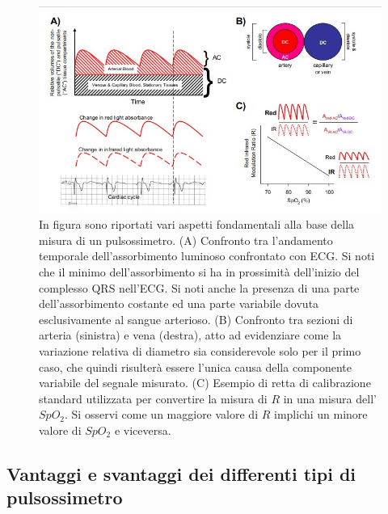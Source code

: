 \documentclass[a4paper, 12pt]{book}
\begin{document}
\begin{figure}[h!]
    \centering
    \includegraphics[width=\textwidth]{ACDC.jpg}
    \caption{In figura sono riportati vari aspetti fondamentali alla base della misura 					 di un pulsossimetro.
   		     (A) Confronto tra l'andamento temporale dell'assorbimento luminoso 						 confrontato con ECG.
 		     Si noti che il minimo dell'assorbimento si ha in prossimità dell'inizio 					 del complesso QRS nell'ECG.
		     Si noti anche la presenza di una parte dell'assorbimento costante ed una 					 parte variabile dovuta esclusivamente al sangue arterioso.
 		     (B) Confronto tra sezioni di arteria (sinistra) e vena (destra), atto ad 					 evidenziare come la variazione relativa di diametro sia considerevole solo 			 per il primo caso, che quindi risulterà essere l'unica causa della 						 componente variabile del segnale misurato.
  		     (C) Esempio di retta di calibrazione standard utilizzata per convertire la 			 misura di $R$ in una misura dell'$SpO_2$.
 		     Si osservi come un maggiore valore di $R$ implichi un minore valore di 					 $SpO_2$ e viceversa.}
    \label{fig:ACDC}
\end{figure}


\subsection{Vantaggi e svantaggi dei differenti tipi di pulsossimetro}
\end{document}
